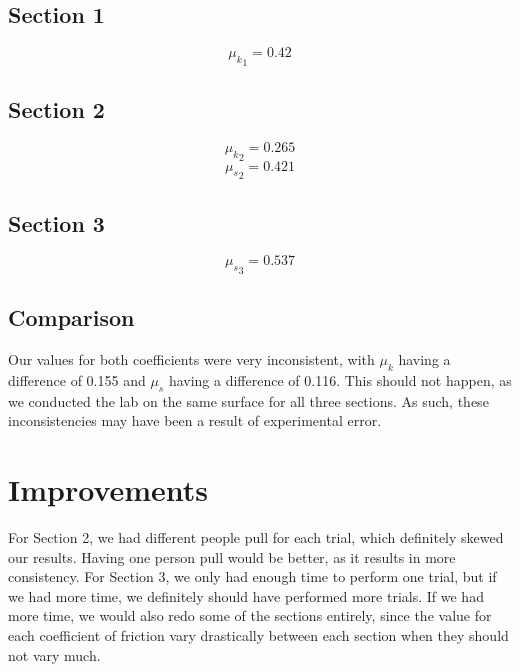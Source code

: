 \documentclass{article}
\begin{document}
\subsection{Section 1}
\[{\mu_k}_1 = 0.42\]
\subsection{Section 2}
\[{\mu_k}_2 = 0.265\]
\[{\mu_s}_2 = 0.421\]
\subsection{Section 3}
\[{\mu_s}_3 = 0.537\]

\subsection{Comparison}
Our values for both coefficients were very inconsistent, with $\mu_k$ having a difference of 0.155 and $\mu_s$ having a difference of 0.116. This should not happen, as we conducted the lab on the same surface for all three sections. As such, these inconsistencies may have been a result of experimental error.

\section{Improvements}
For Section 2, we had different people pull for each trial, which definitely skewed our results. Having one person pull would be better, as it results in more consistency. For Section 3, we only had enough time to perform one trial, but if we had more time, we definitely should have performed more trials. If we had more time, we would also redo some of the sections entirely, since the value for each coefficient of friction vary drastically between each section when they should not vary much.
\end{document}
